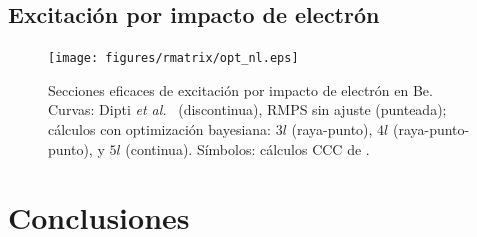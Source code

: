 \subsection{Excitación por impacto de electrón}


\begin{figure}
\centering
\texttt{[image: figures/rmatrix/opt\_nl.eps]} 
\caption[Secciones eficaces de excitación por impacto de electrón en Be.]
{Secciones eficaces de excitación por impacto de electrón en Be.
Curvas: Dipti \textit{et al.}~\cite{Dipti:19} (discontinua), RMPS sin 
ajuste (punteada); cálculos con optimización bayesiana: 
$3l$ (raya-punto), 
$4l$ (raya-punto-punto), y
$5l$ (continua). 
Símbolos: cálculos CCC de \cite{Fursa:97}.}
\end{figure}

\newpage
\section{Conclusiones}
